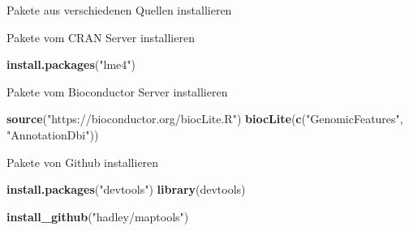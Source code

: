 \documentclass[ignorenonframetext,]{beamer}
\newenvironment{Shaded}{\begin{snugshade}}{\end{snugshade}}
\newcommand{\KeywordTok}[1]{\textcolor[rgb]{0.26,0.66,0.93}{\textbf{#1}}}
\newcommand{\NormalTok}[1]{\textcolor[rgb]{0.74,0.68,0.62}{#1}}
\newcommand{\StringTok}[1]{\textcolor[rgb]{0.02,0.61,0.04}{#1}}
\begin{document}
\begin{frame}[fragile]{Pakete aus verschiedenen Quellen installieren}
\protect\hypertarget{pakete-aus-verschiedenen-quellen-installieren}{}

\begin{block}{Pakete vom CRAN Server installieren}

\begin{Shaded}
\begin{Highlighting}[]
\KeywordTok{install.packages}\NormalTok{(}\StringTok{"lme4"}\NormalTok{)}
\end{Highlighting}
\end{Shaded}

\end{block}

\begin{block}{Pakete vom Bioconductor Server installieren}

\begin{Shaded}
\begin{Highlighting}[]
\KeywordTok{source}\NormalTok{(}\StringTok{"https://bioconductor.org/biocLite.R"}\NormalTok{)}
\KeywordTok{biocLite}\NormalTok{(}\KeywordTok{c}\NormalTok{(}\StringTok{"GenomicFeatures"}\NormalTok{, }\StringTok{"AnnotationDbi"}\NormalTok{))}
\end{Highlighting}
\end{Shaded}

\end{block}

\begin{block}{Pakete von Github installieren}

\begin{Shaded}
\begin{Highlighting}[]
\KeywordTok{install.packages}\NormalTok{(}\StringTok{"devtools"}\NormalTok{)}
\KeywordTok{library}\NormalTok{(devtools)}

\KeywordTok{install_github}\NormalTok{(}\StringTok{"hadley/maptools"}\NormalTok{)}
\end{Highlighting}
\end{Shaded}

\end{block}

\end{frame}
\end{document}
